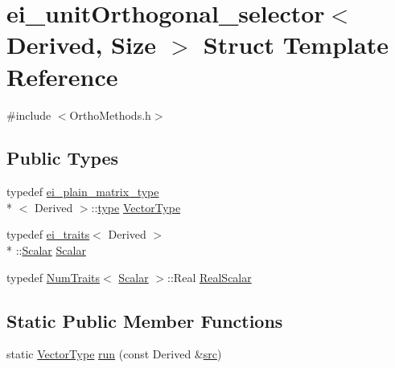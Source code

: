 \hypertarget{structei__unit_orthogonal__selector}{\section{ei\-\_\-unit\-Orthogonal\-\_\-selector$<$ Derived, Size $>$ Struct Template Reference}
\label{structei__unit_orthogonal__selector}
}


{\ttfamily \#include $<$Ortho\-Methods.\-h$>$}

\subsection*{Public Types}
\begin{DoxyCompactItemize}
\item 
typedef \hyperlink{structei__plain__matrix__type}{ei\-\_\-plain\-\_\-matrix\-\_\-type}\\*
$<$ Derived $>$\-::\hyperlink{glext_8h_a7d05960f4f1c1b11f3177dc963a45d86}{type} \hyperlink{structei__unit_orthogonal__selector_a09bb130e9c828910298a99cbb648d185}{Vector\-Type}
\item 
typedef \hyperlink{structei__traits}{ei\-\_\-traits}$<$ Derived $>$\\*
\-::\hyperlink{structei__unit_orthogonal__selector_ad14f3df81f000afc8dba3070f555ebc2}{Scalar} \hyperlink{structei__unit_orthogonal__selector_ad14f3df81f000afc8dba3070f555ebc2}{Scalar}
\item 
typedef \hyperlink{struct_num_traits}{Num\-Traits}$<$ \hyperlink{structei__unit_orthogonal__selector_ad14f3df81f000afc8dba3070f555ebc2}{Scalar} $>$\-::Real \hyperlink{structei__unit_orthogonal__selector_aa5b02d2e377427f0cedff2b12bc9f94f}{Real\-Scalar}
\end{DoxyCompactItemize}
\subsection*{Static Public Member Functions}
\begin{DoxyCompactItemize}
\item 
static \hyperlink{structei__unit_orthogonal__selector_a09bb130e9c828910298a99cbb648d185}{Vector\-Type} \hyperlink{structei__unit_orthogonal__selector_ad62c1bc25c77c3d2014d0756134e7174}{run} (const Derived \&\hyperlink{glext_8h_a72e0fdf0f845ded60b1fada9e9195cd7}{src})
\end{DoxyCompactItemize}


